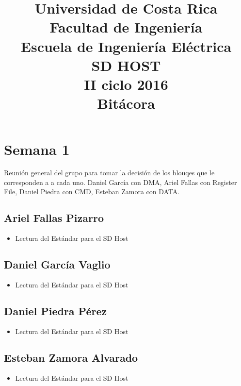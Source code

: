 

\title{Universidad de Costa Rica\\{\small Facultad de Ingeniería\\Escuela de Ingeniería
    Eléctrica\\SD HOST\\II ciclo 2016\\\vspace*{0.55in} Bitácora}}





\section{Semana 1}

Reunión general del grupo para tomar la decisión de los blouqes que le corresponden a a cada
uno. Daniel García con DMA, Ariel Fallas con Register File, Daniel Piedra con CMD, Esteban Zamora
con DATA. 
\subsection{Ariel Fallas Pizarro}
\begin{itemize}
\item Lectura del Estándar para el SD Host
\end{itemize}
\subsection{Daniel García Vaglio}
\begin{itemize}
\item Lectura del Estándar para el SD Host
\end{itemize}

\subsection{Daniel Piedra Pérez}
\begin{itemize}
\item Lectura del Estándar para el SD Host
\end{itemize}

\subsection{Esteban Zamora Alvarado}
\begin{itemize}
\item Lectura del Estándar para el SD Host
\end{itemize}

